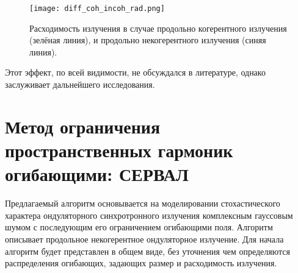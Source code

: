 \begin{figure}[H] 
	\centering 	\texttt{[image: diff\_coh\_incoh\_rad.png]}
	\caption{Расходимость излучения в случае продольно когерентного излучения (зелёная линия), и продольно некогерентного излучения (синяя линия).}
	\label{fig:diff_coh_incoh_rad}
\end{figure}
\noindent Этот эффект, по всей видимости, не обсуждался в литературе, однако заслуживает дальнейшего исследования.
\section{Метод ограничения пространственных гармоник огибающими: СЕРВАЛ}
Предлагаемый алгоритм основывается на моделировании стохастического характера ондуляторного синхротронного излучения комплексным гауссовым шумом с последующим его ограничением огибающими поля. Алгоритм описывает продольное некогерентное ондуляторное излучение. Для начала алгоритм будет представлен в общем виде, без уточнения чем определяются распределения огибающих, задающих размер и расходимость излучения. 
